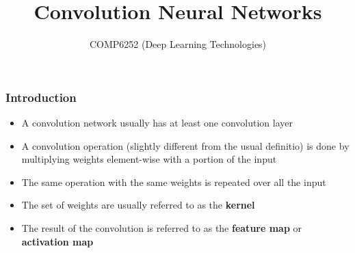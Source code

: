 \documentclass{beamer}
\begin{document}
\title{Convolution Neural Networks}
\author{COMP6252 (Deep Learning Technologies)}
\date{}

\begin{frame}
    \placelogofalse %
    \titlepage
\end{frame}
    
\placelogotrue
\begin{frame}
    \frametitle{Introduction}
    \begin{itemize}
    \item A convolution network usually has at least one convolution layer
    \item A convolution operation (slightly different from the usual definitio) is done by multiplying weights element-wise with a portion of the input
    \item The same operation with the same weights is repeated over all the input
    \item The set of weights are usually referred to as the \textbf{kernel}
    \item The result of the convolution is referred to as the \textbf{feature map} or \textbf{activation map}
    \end{itemize}
  \end{frame}
\end{document}
